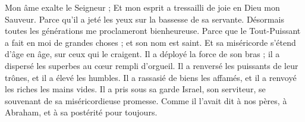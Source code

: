 {{Mon âme exalte le Seigneur ;}}
{Et mon esprit a tressailli de joie en Dieu mon Sauveur.}
{Parce qu'il a jeté les yeux sur la bassesse de sa servante. Désormais toutes les générations me proclameront bienheureuse.}
{Parce que le Tout-Puissant a fait en moi de grandes choses ; et son nom est saint.}
{Et sa miséricorde s'étend d'âge en âge, sur ceux qui le craigent.}
{Il a déployé la force de son bras ; il a dispersé les superbes au c\oe ur rempli d'orgueil.}
{Il a renversé les puissants de leur trônes, et il a élevé les humbles.}
{Il a rassasié de biens les affamés, et il a renvoyé les riches les mains vides.}
{Il a pris sous sa garde Israel, son serviteur, se souvenant de sa miséricordieuse promesse.}
{Comme il l'avait dit à nos pères, à Abraham, et à sa postérité pour toujours.}
